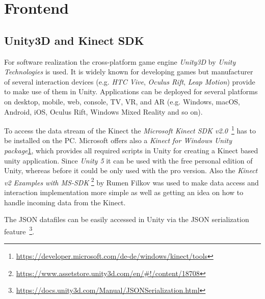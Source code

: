 \section{Frontend}\label{5_4_software}


\subsection{Unity3D and Kinect SDK}

For software realization the cross-platform game engine \textit{Unity3D} by \textit{Unity Technologies} is used. It is widely known for developing games but manufacturer of several interaction devices (e.g. \textit{HTC Vive}, \textit{Oculus Rift}, \textit{Leap Motion}) provide  to make use of them in Unity. Applications can be deployed for several platforms on desktop, mobile, web, console, TV, VR, and AR (e.g. Windows, macOS, Android, iOS, Oculus Rift, Windows Mixed Reality and so on).

To access the data stream of the Kinect the \textit{Microsoft Kinect SDK v2.0}~\footnote{\label{fn:kinectTools}\url{https://developer.microsoft.com/de-de/windows/kinect/tools}} has to be installed on the PC. Microsoft offers also a \textit{Kinect for Windows Unity package}\cref{fn:kinectTools}, which provides all required scripts in Unity for creating a Kinect based unity application. Since \textit{Unity 5} it can be used with the free personal edition of Unity, whereas before it could be only used with the pro version. Also the \textit{Kinect v2 Examples with MS-SDK} \footnote{\url{https://www.assetstore.unity3d.com/en/\#!/content/18708}} by Rumen Filkov was used to make data access and interaction implementation more simple as well as getting an idea on how to handle incoming data from the Kinect.


The JSON datafiles can be easily accessed in Unity via the JSON serialization feature~\footnote{\url{https://docs.unity3d.com/Manual/JSONSerialization.html}}. 

